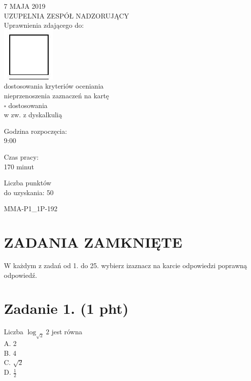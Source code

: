 \documentclass[10pt]{article}
\begin{document}
7 MAJA 2019\\
UZUPELNIA ZESPÓŁ NADZORUJĄCY\\
Uprawnienia zdającego do:\\
\includegraphics[max width=\textwidth, center]{2024_11_21_d51d653f4fe4a5bb0c33g-01(2)}\\
dostosowania kryteriów oceniania\\
nieprzenoszenia zaznaczeń na kartę\\
\(\square\) dostosowania\\
w zw. z dyskalkulią

Godzina rozpoczęcia:\\
9:00

Czas pracy:\\
170 minut

Liczba punktów\\
do uzyskania: 50

MMA-P1\_1P-192

\section*{ZADANIA ZAMKNIĘTE}
W każdym z zadań od 1. do 25. wybierz izaznacz na karcie odpowiedzi poprawną odpowiedź.

\section*{Zadanie 1. (1 pht)}
Liczba \(\log _{\sqrt{2}} 2\) jest równa\\
A. 2\\
B. 4\\
C. \(\sqrt{2}\)\\
D. \(\frac{1}{2}\)
\end{document}

